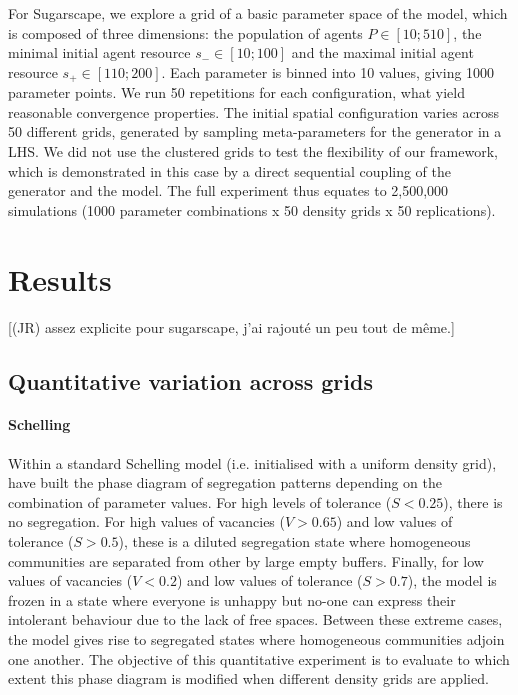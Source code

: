 \documentclass[Royal,sageh,times]{sagej}
\begin{document}
For Sugarscape, we explore a grid of a basic parameter space of the model, which is composed of three dimensions: the population of agents $P\in \left[10;510\right]$, the minimal initial agent resource $s_{-}\in \left[10;100\right]$ and the maximal initial agent resource $s_{+}\in \left[110;200\right]$. Each parameter is binned into 10 values, giving 1000 parameter points. We run 50 repetitions for each configuration, what yield reasonable convergence properties. The initial spatial configuration varies across 50 different grids, generated by sampling meta-parameters for the generator in a LHS. We did not use the clustered grids to test the flexibility of our framework, which is demonstrated in this case by a direct sequential coupling of the generator and the model. The full experiment thus equates to 2,500,000 simulations (1000 parameter combinations x 50 density grids x 50 replications). 


\section{Results}

[(JR) assez explicite pour sugarscape, j'ai rajouté un peu tout de même.]

\subsection{Quantitative variation across grids}
\paragraph{Schelling} 
Within a standard Schelling model (i.e. initialised with a uniform density grid), \citet{Gauvinetal2009} have built the phase diagram of segregation patterns depending on the combination of parameter values. For high levels of tolerance ($S < 0.25$), there is no segregation. For high values of vacancies ($V > 0.65$) and low values of tolerance ($S > 0.5$), these is a diluted segregation state where homogeneous communities are separated from other by large empty buffers. Finally, for low values of vacancies ($V < 0.2$) and low values of tolerance ($S > 0.7$), the model is frozen in a state where everyone is unhappy but no-one can express their intolerant behaviour due to the lack of free spaces. Between these extreme cases, the model gives rise to segregated states where homogeneous communities adjoin one another. The objective of this quantitative experiment is to evaluate to which extent this phase diagram is modified when different density grids are applied. 
\end{document}
